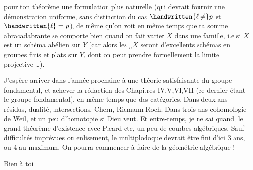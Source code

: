 
pour ton théorème une formulation plus naturelle (qui devrait 
fournir une démonstration uniforme, sans distinction du cas $\handwritten{\ell\ne}p$
et $\handwritten{\ell}=p$), de même qu'on voit en même temps que ta somme abracadabrante se comporte bien quand on fait varier $X$ dans une famille, i.e
si $X$ est  un schéma abélien sur $Y$ (car alors les ${}_nX$
seront d'excellents schémas en groupes finis et plats sur $Y$, dont on
peut prendre formellement la limite projective \ldots).

J'espère arriver dans l'année prochaine à une théorie satisfaisante du groupe fondamental,  et achever la rédaction des
Chapitres IV,V,VI,VII (ce dernier étant le groupe fondamental), en
même temps que des catégories. Dans deux ans résidus, dualité,
intersections, Chern, Riemann-Roch. Dans trois ans cohomologie de
Weil, et un peu d'homotopie si Dieu veut. Et entre-temps, je ne sai
quand, le grand théorème d'existence avec Picard etc, un peu de
courbes algébriques,  Sauf difficultés imprévues ou enlisement,
le multiplodoque devrait être fini d'ici 3 ans, ou 4 au maximum. On
pourra commencer à faire de la géométrie algébrique !

Bien à toi\\
